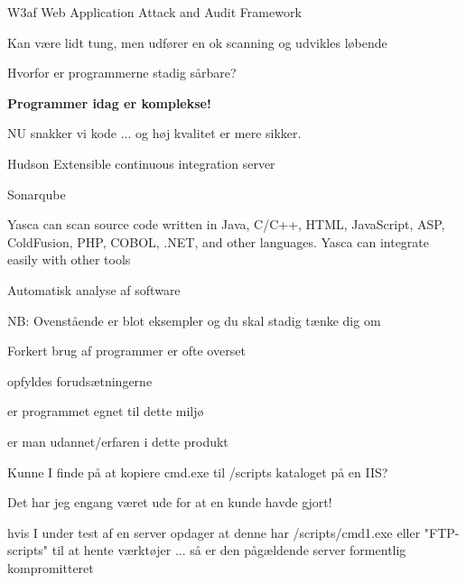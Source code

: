 \documentclass[20pt,landscape,a4paper,footrule]{foils}
\begin{document}


\begin{list1}
\item W3af Web Application Attack and Audit Framework
\item Kan være lidt tung, men udfører en ok scanning og udvikles løbende
\item {}
\end{list1}





\begin{list1}
\item Hvorfor er programmerne stadig sårbare?
\item {\bf Programmer idag er komplekse!}
\item NU snakker vi kode ... og høj kvalitet er mere sikker.
\item Hudson Extensible continuous integration server 
\item Sonarqube 
\item Yasca can scan source code written in Java, C/C++, HTML, JavaScript, ASP, ColdFusion, PHP, COBOL, .NET, and other languages. Yasca can integrate easily with other tools\\

\item Automatisk analyse af software\\
{\small{}}
\end{list1}

NB: Ovenstående er blot eksempler og du skal stadig tænke dig om \smiley



\begin{list1}
\item Forkert brug af programmer er ofte overset
\begin{list2}
\item opfyldes forudsætningerne
\item er programmet egnet til dette miljø
\item er man udannet/erfaren i dette produkt
\end{list2}
\item Kunne I finde på at kopiere cmd.exe til
/scripts kataloget på en IIS?
\item Det har jeg engang været ude for at en kunde havde gjort!
\item hvis I under test af en server opdager at denne har
  /scripts/cmd1.exe eller "FTP-scripts" til at hente værktøjer ...
så er den pågældende server formentlig kompromitteret
\end{list1}
\end{document}
